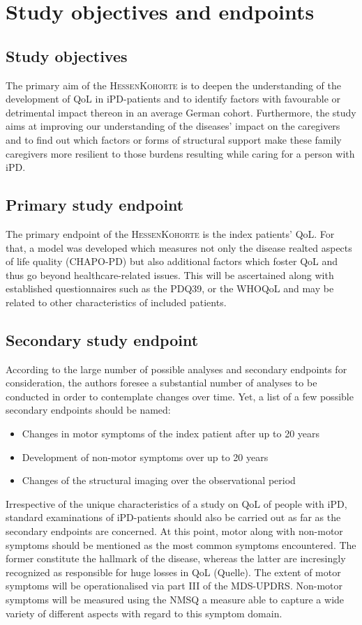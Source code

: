 \section{Study objectives and endpoints}
\subsection{Study objectives}
The primary aim of the \textsc{HessenKohorte} is to deepen the understanding of the development of \ac{QoL} in \ac{iPD}-patients and to identify factors with favourable or detrimental impact thereon in an average German cohort. Furthermore, the study aims at improving our understanding of the diseases' impact on the caregivers and to find out which factors or forms of structural support make these family caregivers more resilient to those burdens resulting while caring for a person with \ac{iPD}.

\subsection{Primary study endpoint}
The primary endpoint of the \textsc{HessenKohorte} is the index patients' \ac{QoL}. For that, a model was developed which measures not only the disease realted aspects of life quality (\ac{CHAPO-PD}) but also additional factors which foster \ac{QoL} and thus go beyond healthcare-related issues. This will be ascertained along with established questionnaires such as the \ac{PDQ39}\cite{jenkinson1997pdq39}, or the \ac{WHOQoL}\cite{group1998world} and may be related to other characteristics of included patients.

\subsection{Secondary study endpoint}
According to the large number of possible analyses and secondary endpoints for consideration, the authors foresee a substantial
number of analyses to be conducted in order to contemplate changes over time. Yet, a list of a few possible secondary endpoints should be named:
\begin{itemize}
  \item{Changes in motor symptoms of the index patient after up to 20 years}
  \item{Development of non-motor symptoms over up to 20 years}
  \item{Changes of the structural imaging over the observational period} 
\end{itemize}
Irrespective of the unique characteristics of a study on \ac{QoL} of people with \ac{iPD}, standard examinations of \ac{iPD}-patients should also be carried out as far as the secondary endpoints are concerned. At this point, motor along with non-motor symptoms should be mentioned as the most common symptoms encountered. The former constitute the hallmark of the disease, whereas the latter are incresingly recognized as responsible for huge losses in \ac{QoL} (Quelle). The extent of motor symptoms will be operationalised via part III of the \ac{MDS-UPDRS}\cite{goetz2007updrs}. Non-motor symptoms will be measured using the \ac{NMSQ} a measure able to capture a wide variety of different aspects with regard to this symptom domain.

